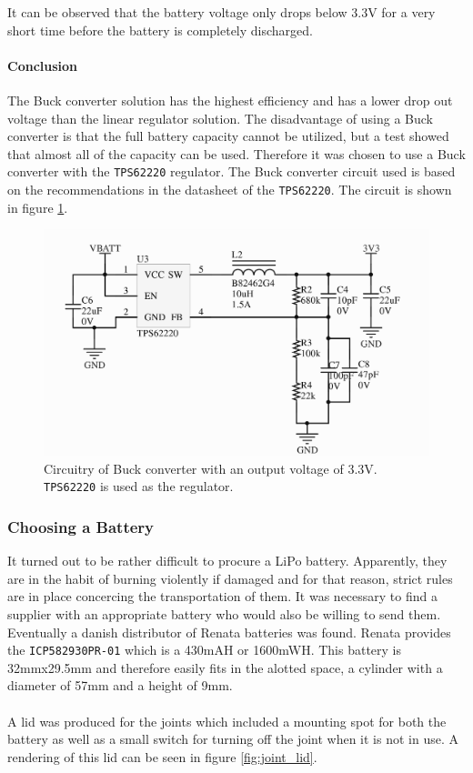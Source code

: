 It can be observed that the battery voltage only drops below 3.3V for a very short time before the battery is completely discharged.

\paragraph{Conclusion}
The Buck converter solution has the highest efficiency and has a lower drop out voltage than the linear regulator solution.
The disadvantage of using a Buck converter is that the full battery capacity cannot be utilized, but a test showed that almost all of the capacity can be used.
Therefore it was chosen to use a Buck converter with the \texttt{TPS62220} regulator. 
The Buck converter circuit used is based on the recommendations in the datasheet of the \texttt{TPS62220}.
The circuit is shown in figure \ref{fig:tps62220_circuit}.

\begin{figure}[h]
	\centering
    \includegraphics[width=.8\linewidth]{graphics/tps6220_circuit}
	\caption[3.3 V buck converter circuitry.]{Circuitry of Buck converter with an output voltage of 3.3V. \texttt{TPS62220} is used as the regulator.}
	\label{fig:tps62220_circuit}
\end{figure}

\subsubsection{Choosing a Battery} %
\label{ssub:choosing_a_battery}
It turned out to be rather difficult to procure a LiPo battery.
Apparently, they are in the habit of burning violently if damaged and for that reason, strict rules are in place concercing the transportation of them.
It was necessary to find a supplier with an appropriate battery who would also be willing to send them.
Eventually a danish distributor of Renata batteries was found.
Renata provides the \texttt{ICP582930PR-01} which is a 430mAH or 1600mWH.
This battery is 32mmx29.5mm and therefore easily fits in the alotted space, a cylinder with a diameter of 57mm and a height of 9mm.
\\~\\
A lid was produced for the joints which included a mounting spot for both the battery as well as a small switch for turning off the joint when it is not in use.
A rendering of this lid can be seen in figure \ref{fig:joint_lid}.

